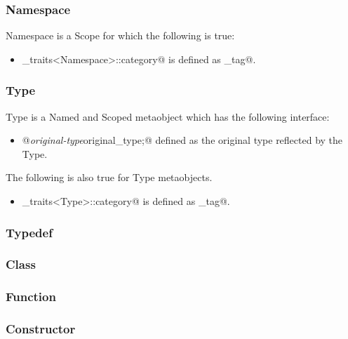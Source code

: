 \subsubsection{Namespace}

{\metaobject Namespace} is a {\metaobject Scope} for which the following is true:

\begin{itemize}
	\item \verb@metaobject_traits<Namespace>::category@ is defined as
	\verb@namespace_tag@.
\end{itemize}


\subsubsection{Type}

{\metaobject Type} is a {\metaobject Named} and {\metaobject Scoped} metaobject which
has the following interface:

\begin{itemize}
	\item{\verb@typedef @{\em original-type}\verb@ original_type;@} defined as the original type
	reflected by the {\metaobject Type}.
\end{itemize}

The following is also true for {\metaobject Type} metaobjects.

\begin{itemize}
	\item \verb@metaobject_traits<Type>::category@ is defined as \verb@type_tag@.
\end{itemize}

\subsubsection{Typedef}

\subsubsection{Class}

\subsubsection{Function}

\subsubsection{Constructor}

